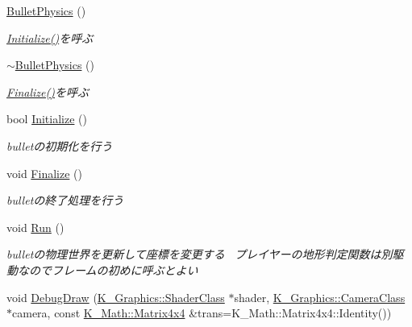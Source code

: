 \begin{DoxyCompactItemize}
\item 
\mbox{\hyperlink{class_k___physics_1_1_bullet_physics_a8c8e7b9c5c8c53861e409aa7a6a644f4}{Bullet\+Physics}} ()
\begin{DoxyCompactList}\small\item\em \mbox{\hyperlink{class_k___physics_1_1_bullet_physics_ad280b1eeb62f13463d47be6182d5b978}{Initialize()}}を呼ぶ \end{DoxyCompactList}\item 
\mbox{\hyperlink{class_k___physics_1_1_bullet_physics_a0fca03e6a99d9cc53cc86f54629f23a7}{$\sim$\+Bullet\+Physics}} ()
\begin{DoxyCompactList}\small\item\em \mbox{\hyperlink{class_k___physics_1_1_bullet_physics_ae7d67b163870213501e3bba697981b35}{Finalize()}}を呼ぶ \end{DoxyCompactList}\item 
bool \mbox{\hyperlink{class_k___physics_1_1_bullet_physics_ad280b1eeb62f13463d47be6182d5b978}{Initialize}} ()
\begin{DoxyCompactList}\small\item\em bulletの初期化を行う \end{DoxyCompactList}\item 
void \mbox{\hyperlink{class_k___physics_1_1_bullet_physics_ae7d67b163870213501e3bba697981b35}{Finalize}} ()
\begin{DoxyCompactList}\small\item\em bulletの終了処理を行う \end{DoxyCompactList}\item 
void \mbox{\hyperlink{class_k___physics_1_1_bullet_physics_a251957471a8ab4f8bbace69c995d325f}{Run}} ()
\begin{DoxyCompactList}\small\item\em bulletの物理世界を更新して座標を変更する~\newline
プレイヤーの地形判定関数は別駆動なのでフレームの初めに呼ぶとよい \end{DoxyCompactList}\item 
void \mbox{\hyperlink{class_k___physics_1_1_bullet_physics_a772c665942f1e1855cd218f50b44a9d7}{Debug\+Draw}} (\mbox{\hyperlink{class_k___graphics_1_1_shader_class}{K\+\_\+\+Graphics\+::\+Shader\+Class}} $\ast$shader, \mbox{\hyperlink{class_k___graphics_1_1_camera_class}{K\+\_\+\+Graphics\+::\+Camera\+Class}} $\ast$camera, const \mbox{\hyperlink{namespace_k___math_a345271af9d32dff2c964bc679b13b45c}{K\+\_\+\+Math\+::\+Matrix4x4}} \&trans=K\+\_\+\+Math\+::\+Matrix4x4\+::\+Identity())

\end{DoxyCompactItemize}
